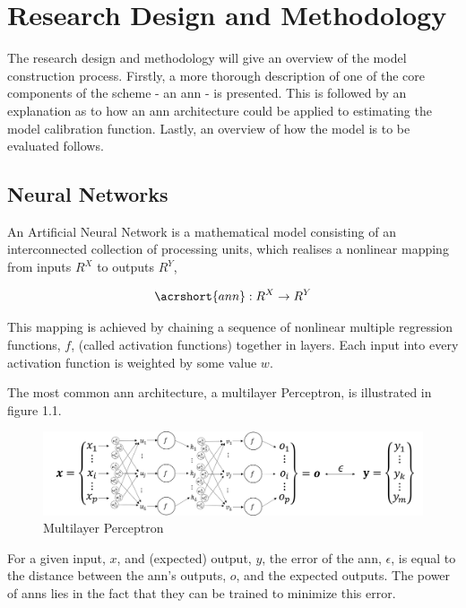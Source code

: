 \documentclass[11pt,oneside,openany,a4paper,english, report, goldenblock
]{usthesis}
\begin{document}
\section{Research Design and Methodology}
The research design and methodology will give an overview of the model construction process. Firstly, a more thorough description of one of the core components of the scheme - an \acrshort{ann} - is presented. This is followed by an explanation as to how an \acrshort{ann} architecture could be applied to estimating the model calibration function. Lastly, an overview of how the model is to be evaluated follows.

\subsection{Neural Networks}
An Artificial Neural Network is a mathematical model consisting of an interconnected collection of processing units, which realises a nonlinear mapping from inputs $R^X$ to outputs $R^Y$,

\begin{equation}
	\acrshort{ann}: R^X \rightarrow R^Y
\end{equation}

This mapping is achieved by chaining a sequence of nonlinear multiple regression functions, $f$, (called activation functions) together in layers.  Each input into every activation function is weighted by some value $w$.


The most common \acrshort{ann} architecture, a multilayer Perceptron, is illustrated in figure 1.1.

\begin{figure}[h]
	\centering
	\includegraphics[width=1\linewidth]{Images/Diagrams/NeuralNetwork}
	\caption[Multilayer Perceptron]{Multilayer Perceptron}
	\label{fig:neuralnetwork}
\end{figure}

For a given input, $x$, and (expected) output, $y$, the error of the \acrshort{ann}, $ \epsilon $, is equal to the distance between the \acrshort{ann}'s outputs, $o$, and the expected outputs. The power of \acrshort{ann}s lies in the fact that they can be trained to minimize this error. 
\end{document}
